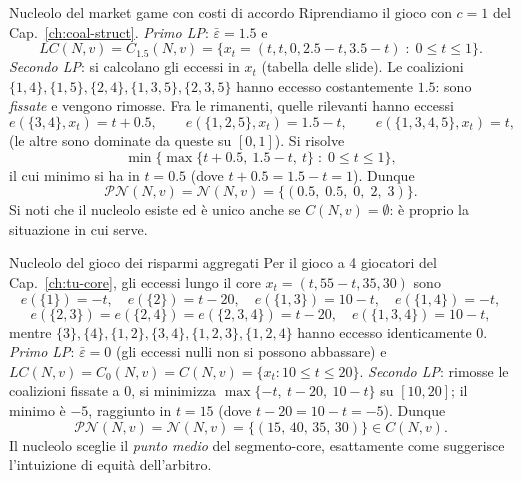 \documentclass[12pt,a4paper,twoside]{book}
\theoremstyle{plain}
\theoremstyle{definition}
\begin{document}
\begin{exbox}{Nucleolo del market game con costi di accordo}
Riprendiamo il gioco con $c=1$ del Cap.~\ref{ch:coal-struct}. \emph{Primo LP}:
$\bar\varepsilon=1.5$ e
\[
  LC(N,v)=C_{1.5}(N,v)=\{x_t=(t,t,0,2.5-t,3.5-t)\;:\;0\le t\le 1\}.
\]
\emph{Secondo LP}: si calcolano gli eccessi in $x_t$ (tabella delle slide). Le
coalizioni $\{1,4\},\{1,5\},\{2,4\},\{1,3,5\},\{2,3,5\}$ hanno eccesso
costantemente $1.5$: sono \emph{fissate} e vengono rimosse. Fra le rimanenti,
quelle rilevanti hanno eccessi
\[
  e(\{3,4\},x_t)=t+0.5,\qquad e(\{1,2,5\},x_t)=1.5-t,\qquad e(\{1,3,4,5\},x_t)=t,
\]
(le altre sono dominate da queste su $[0,1]$). Si risolve
\[
  \min\bigl\{\max\{t+0.5,\ 1.5-t,\ t\}\;:\;0\le t\le 1\bigr\},
\]
il cui minimo si ha in $t=0.5$ (dove $t+0.5=1.5-t=1$). Dunque
\[
  \mathcal{PN}(N,v)=\mathcal{N}(N,v)=\{(0.5,\;0.5,\;0,\;2,\;3)\}.
\]
Si noti che il nucleolo esiste ed è unico anche se $C(N,v)=\emptyset$: è
proprio la situazione in cui serve.
\end{exbox}

\begin{exbox}{Nucleolo del gioco dei risparmi aggregati}
Per il gioco a 4 giocatori del Cap.~\ref{ch:tu-core}, gli eccessi lungo il core
$x_t=(t,55-t,35,30)$ sono
\[
  e(\{1\})=-t,\quad e(\{2\})=t-20,\quad e(\{1,3\})=10-t,\quad e(\{1,4\})=-t,
\]
\[
  e(\{2,3\})=e(\{2,4\})=e(\{2,3,4\})=t-20,\quad e(\{1,3,4\})=10-t,
\]
mentre $\{3\},\{4\},\{1,2\},\{3,4\},\{1,2,3\},\{1,2,4\}$ hanno eccesso
identicamente $0$.
\emph{Primo LP}: $\bar\varepsilon=0$ (gli eccessi nulli non si possono abbassare) e
$LC(N,v)=C_{0}(N,v)=C(N,v)=\{x_t:10\le t\le 20\}$.
\emph{Secondo LP}: rimosse le coalizioni fissate a $0$, si minimizza
$\max\{-t,\ t-20,\ 10-t\}$ su $[10,20]$; il minimo è $-5$, raggiunto in $t=15$
(dove $t-20=10-t=-5$). Dunque
\[
  \mathcal{PN}(N,v)=\mathcal{N}(N,v)=\{(15,\,40,\,35,\,30)\}\in C(N,v).
\]
Il nucleolo sceglie il \emph{punto medio} del segmento-core, esattamente come
suggerisce l'intuizione di equità dell'arbitro.
\end{exbox}
\end{document}
